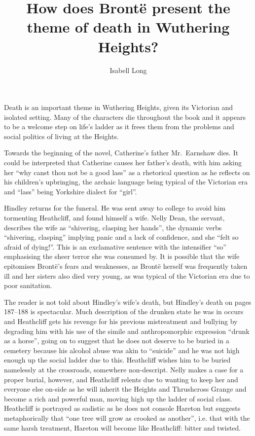 \documentclass[a4paper,12pt]{article}
\begin{document}
\title{How does Bront\"{e} present the theme of death in Wuthering Heights?}
\author{Isabell Long}
\maketitle

Death is an important theme in Wuthering Heights, given its Victorian and isolated setting. Many of the characters die throughout the book and it appears to be a welcome step on life's ladder as it frees them from the problems and social politics of living at the Heights.

Towards the beginning of the novel, Catherine's father Mr.\ Earnshaw dies. It could be interpreted that Catherine causes her father's death, with him asking her ``why canst thou not be a good lass'' as a rhetorical question as he reflects on his children's upbringing, the archaic language being typical of the Victorian era and ``lass'' being Yorkshire dialect for ``girl''.

Hindley returns for the funeral. He was sent away to college to avoid him tormenting Heathcliff, and found himself a wife. Nelly Dean, the servant, describes the wife as ``shivering, clasping her hands'', the dynamic verbs ``shivering, clasping'' implying panic and a lack of confidence, and she ``felt so afraid of dying!''. This is an exclamative sentence with the intensifier ``so'' emphasising the sheer terror she was consumed by. It is possible that the wife epitomises Bront\"{e}'s fears and weaknesses, as Bront\"{e} herself was frequently taken ill and her sisters also died very young, as was typical of the Victorian era due to poor sanitation.

The reader is not told about Hindley's wife's death, but Hindley's death on pages 187--188 is spectacular. Much description of the drunken state he was in occurs and Heathcliff gets his revenge for his previous mistreatment and bullying by degrading him with his use of the simile and anthropomorphic expression ``drunk as a horse'', going on to suggest that he does not deserve to be buried in a cemetery because his alcohol abuse was akin to ``suicide'' and he was not high enough up the social ladder due to this. Heathcliff wishes him to be buried namelessly at the crossroads, somewhere non-descript. Nelly makes a case for a proper burial, however, and Heathcliff relents due to wanting to keep her and everyone else on-side as he will inherit the Heights and Thrushcross Grange and become a rich and powerful man, moving high up the ladder of social class. Heathcliff is portrayed as sadistic as he does not console Hareton but suggests metaphorically that ``one tree will grow as crooked as another'', i.e. that with the same harsh treatment, Hareton will become like Heathcliff: bitter and twisted.
\end{document}
